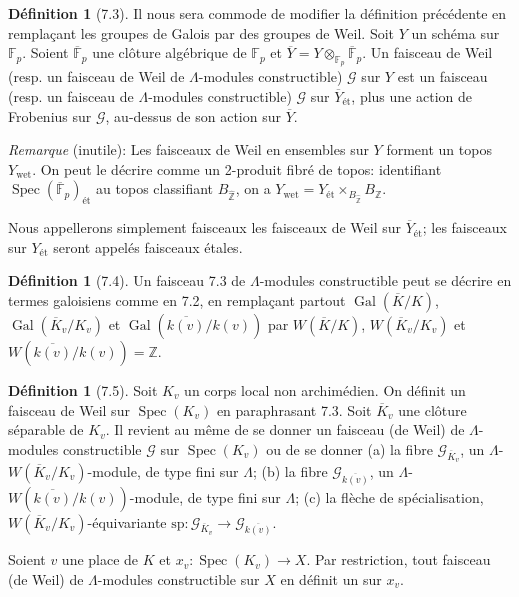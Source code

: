 \documentclass[11pt]{amsart}
\theoremstyle{plain}
\theoremstyle{definition}
\newtheorem{definition}[theorem]{D\'efinition}
\DeclareMathOperator{\Gal}{Gal}
\DeclareMathOperator{\Spec}{Spec}
\begin{document}
\begin{definition}[7.3]
Il nous sera commode de modifier la d\'efinition pr\'ec\'edente en rempla\c{c}ant les groupes de Galois par des groupes de Weil. Soit $Y$ un sch\'ema sur $\mathbb{F}_p$. Soient $\overline{\mathbb{F}}_p$ une cl\^oture alg\'ebrique de $\mathbb{F}_p$ et $\overline{Y} = Y \otimes_{\mathbb{F}_p} \overline{\mathbb{F}}_p$. Un faisceau de Weil (resp. un faisceau de Weil de $\Lambda$-modules constructible) $\mathcal{G}$ sur $Y$ est un faisceau (resp. un faisceau de $\Lambda$-modules constructible) $\mathcal{G}$ sur $\overline{Y}_{\text{\'et}}$, plus une action de Frobenius sur $\mathcal{G}$, au-dessus de son action sur $\overline{Y}$.

\emph{Remarque} (inutile): Les faisceaux de Weil en ensembles sur $Y$ forment un topos $Y_{\mathrm{wet}}$. On peut le d\'ecrire comme un 2-produit fibr\'e de topos: identifiant $\Spec(\overline{\mathbb{F}}_p)_{\text{\'et}}$ au topos classifiant $B_{\widehat{\mathbb{Z}}}$, on a $Y_{\mathrm{wet}} = Y_{\text{\'et}} \times_{B_{\widehat{\mathbb{Z}}}} B_{\mathbb{Z}}$.

Nous appellerons simplement faisceaux les faisceaux de Weil sur $\overline{Y}_{\text{\'et}}$; les faisceaux sur $Y_{\text{\'et}}$ seront appel\'es faisceaux \'etales.
\end{definition}

\begin{definition}[7.4]
Un faisceau 7.3 de $\Lambda$-modules constructible peut se d\'ecrire en termes galoisiens comme en 7.2, en rempla\c{c}ant partout $\Gal(\overline{K}/K)$, $\Gal(\overline{K}_v/K_v)$ et $\Gal(\overline{k(v)}/k(v))$ par $W(\overline{K}/K)$, $W(\overline{K}_v/K_v)$ et $W(\overline{k(v)}/k(v)) = \mathbb{Z}$.
\end{definition}

\begin{definition}[7.5]
Soit $K_v$ un corps local non archim\'edien. On d\'efinit un faisceau de Weil sur $\Spec(K_v)$ en paraphrasant 7.3. Soit $\overline{K}_v$ une cl\^oture s\'eparable de $K_v$. Il revient au m\^eme de se donner un faisceau (de Weil) de $\Lambda$-modules constructible $\mathcal{G}$ sur $\Spec(K_v)$ ou de se donner (a) la fibre $\mathcal{G}_{\overline{K}_v}$, un $\Lambda$-$W(\overline{K}_v/K_v)$-module, de type fini sur $\Lambda$; (b) la fibre $\mathcal{G}_{\overline{k(v)}}$, un $\Lambda$-$W(\overline{k(v)}/k(v))$-module, de type fini sur $\Lambda$; (c) la fl\`eche de sp\'ecialisation, $W(\overline{K}_v/K_v)$-\'equivariante $\mathrm{sp}: \mathcal{G}_{\overline{K}_v} \to \mathcal{G}_{\overline{k(v)}}$.

Soient $v$ une place de $K$ et $x_v: \Spec(K_v) \to X$. Par restriction, tout faisceau (de Weil) de $\Lambda$-modules constructible sur $X$ en d\'efinit un sur $x_v$.
\end{definition}
\end{document}
